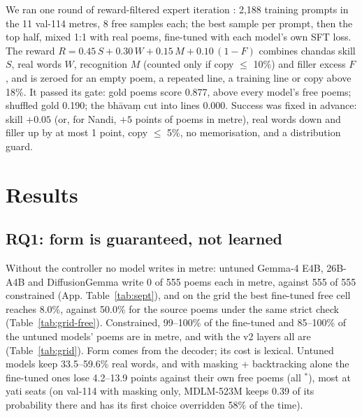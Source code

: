 \documentclass[11pt]{article}
\newcommand{\sig}{$^{\ast}$}
\begin{document}
We ran one round of reward-filtered expert iteration \citep{anthony2017exit,gulcehre2023rest}: 2,188 training
prompts in the 11 val-114 metres, 8 free samples each; the best sample per prompt, then the top half, mixed
1:1 with real poems, fine-tuned with each model's own SFT loss. The reward
$R = 0.45\,S + 0.30\,W + 0.15\,M + 0.10\,(1 - F)$ combines chandas skill $S$, real words $W$, recognition $M$
(counted only if copy $\leq$ 10\%) and filler excess $F$, and is zeroed for an empty poem, a repeated line, a
training line or copy above 18\%. It passed its gate: gold poems score 0.877, above every model's free poems;
shuffled gold 0.190; the bhāvaṃ cut into lines 0.000. Success was fixed in advance: skill $+0.05$ (or,
for Nandi, $+5$ points of poems in metre), real words down and filler up by at most 1 point, copy $\leq$ 5\%,
no memorisation, and a distribution guard.

\section{Results}\label{sec:results}

\subsection{RQ1: form is guaranteed, not learned}\label{sec:rq1}

Without the controller no model writes in metre: untuned Gemma-4 E4B, 26B-A4B and DiffusionGemma write 0 of 555
poems each in metre, against 555 of 555 constrained (App. Table~\ref{tab:sept}), and on the grid the best
fine-tuned free cell reaches 8.0\%, against 50.0\% for the source poems under the same strict check
(Table~\ref{tab:grid-free}). Constrained, 99--100\% of the fine-tuned and 85--100\% of the untuned models' poems
are in metre, and with the v2 layers all are (Table~\ref{tab:grid}). Form comes from the decoder; its cost is
lexical. Untuned models keep 33.5--59.6\% real words, and with masking + backtracking alone the fine-tuned ones
lose 4.2--13.9 points against their own free poems (all \sig), most at yati seats (on val-114 with masking only,
MDLM-523M keeps 0.39 of its probability there and has its first choice overridden 58\% of the time).
\end{document}
